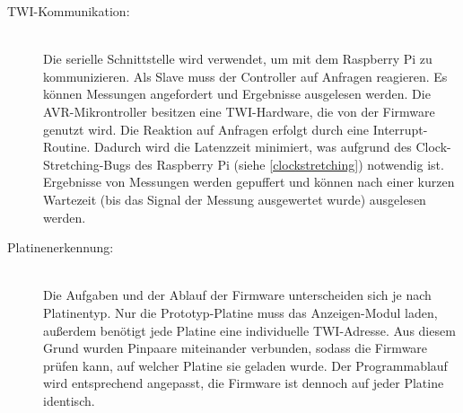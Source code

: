 \begin{description}
	\item[\ac{TWI}-Kommunikation:] \hfill \\
		Die serielle Schnittstelle wird verwendet, um mit dem Raspberry Pi zu kommunizieren. Als Slave muss der Controller auf Anfragen reagieren. Es können Messungen angefordert und Ergebnisse ausgelesen werden. Die AVR-Mikrontroller besitzen eine \ac{TWI}-Hardware, die von der Firmware genutzt wird. Die Reaktion auf Anfragen erfolgt durch eine Interrupt-Routine. Dadurch wird die Latenzzeit minimiert, was aufgrund des Clock-Stretching-Bugs des Raspberry Pi (siehe \ref{clockstretching}) notwendig ist. Ergebnisse von Messungen werden gepuffert und können nach einer kurzen Wartezeit (bis das Signal der Messung ausgewertet wurde) ausgelesen werden.
	\item[Platinenerkennung:] \hfill \\
		Die Aufgaben und der Ablauf der Firmware unterscheiden sich je nach Platinentyp. Nur die Prototyp-Platine muss das Anzeigen-Modul laden, außerdem benötigt jede Platine eine individuelle \ac{TWI}-Adresse. Aus diesem Grund wurden Pinpaare miteinander verbunden, sodass die Firmware prüfen kann, auf welcher Platine sie geladen wurde. Der Programmablauf wird entsprechend angepasst, die Firmware ist dennoch auf jeder Platine identisch.
\end{description}


